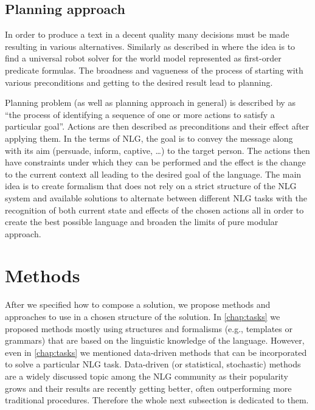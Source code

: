 \subsection{Planning approach}
In order to produce a text in a decent quality many decisions must be made resulting in various alternatives. Similarly as described in \cite{fikes1971strips} where the idea is to find a universal robot solver for the world model represented as first-order predicate formulas. The broadness and vagueness of the process of starting with various preconditions and getting to the desired result lead to planning.

Planning problem (as well as planning approach in general) is described by \cite{gatt2018survey} as ``the process of identifying a sequence of one or more actions to satisfy a particular goal”. Actions are then described as preconditions and their effect after applying them. In the terms of NLG, the goal is to convey the message along with its aim (persuade, inform, captive, …) to the target person. The actions then have constraints under which they can be performed and the effect is the change to the current context all leading to the desired goal of the language. The main idea is to create formalism that does not rely on a strict structure of the NLG system and available solutions to alternate between different NLG tasks with the recognition of both current state and effects of the chosen actions all in order to create the best possible language and broaden the limits of pure modular approach. 

\section{Methods}
After we specified how to compose a solution, we propose methods and approaches to use in a chosen structure of the solution. In \ref{chap:tasks} we proposed  methods mostly using structures and formalisms (e.g., templates or grammars) that are based on the linguistic knowledge of the language. However, even in \ref{chap:tasks} we mentioned data-driven methods that can be incorporated to solve a particular NLG task. Data-driven (or statistical,  stochastic) methods are a widely discussed topic among the NLG community as their popularity grows and their results are recently getting better, often outperforming more traditional procedures. Therefore the whole next subsection is dedicated to them. 

